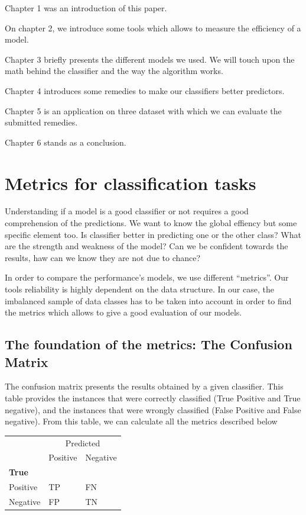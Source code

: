 \documentclass[
]{report}
\begin{document}
Chapter 1 was an introduction of this paper.

On chapter 2, we introduce some tools which allows to measure the efficiency of a model.

Chapter 3 briefly presents the different models we used. We will touch upon the math behind the classifier and the way the algorithm works.

Chapter 4 introduces some remedies to make our classifiers better predictors.

Chapter 5 is an application on three dataset with which we can evaluate the submitted remedies.

Chapter 6 stands as a conclusion.

\hypertarget{metrics-for-classification-tasks}{%
\chapter{Metrics for classification tasks}\label{metrics-for-classification-tasks}}

Understanding if a model is a good classifier or not requires a good comprehension of the predictions. We want to know the global effiency but some specific element too. Is classifier better in predicting one or the other class? What are the strength and weakness of the model? Can we be confident towards the results, haw can we know they are not due to chance?

In order to compare the performance's models, we use different ``metrics''. Our tools reliability is highly dependent on the data structure. In our case, the imbalanced sample of data classes has to be taken into account in order to find the metrics which allows to give a good evaluation of our models.

\hypertarget{the-foundation-of-the-metrics-the-confusion-matrix}{%
\section{The foundation of the metrics: The Confusion Matrix}\label{the-foundation-of-the-metrics-the-confusion-matrix}}

The confusion matrix presents the results obtained by a given classifier. This table provides the instances that were correctly classified (True Positive and True negative), and the instances that were wrongly classified (False Positive and False negative).
From this table, we can calculate all the metrics described below

\begin{table}
\centering
\begin{tabular}{l|l|l}
\hline
\multicolumn{1}{c|}{ } & \multicolumn{2}{c}{Predicted} \\
\cline{2-3}
  & Positive & Negative\\
\hline
\multicolumn{3}{l}{\textbf{True}}\\
\hline
\hspace{1em}Positive & TP & FN\\
\hline
\hspace{1em}Negative & FP & TN\\
\hline
\end{tabular}
\end{table}
\end{document}
